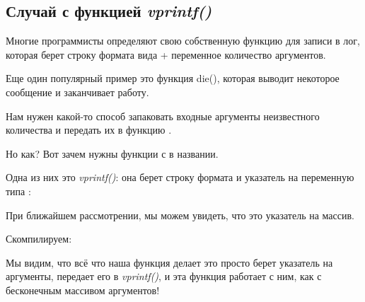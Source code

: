 \subsection{Случай с функцией \emph{vprintf()}}

Многие программисты определяют свою собственную функцию для записи в лог, которая берет строку формата 
вида \printf + переменное количество аргументов.

Еще один популярный пример это функция die(), которая выводит некоторое сообщение и заканчивает работу.

Нам нужен какой-то способ запаковать входные аргументы неизвестного количества и передать их в функцию \printf.

Но как?
Вот зачем нужны функции с  в названии.

Одна из них это \emph{vprintf()}: она берет строку формата и указатель на переменную типа :



При ближайшем рассмотрении, мы можем увидеть, что  это указатель на массив.

Скомпилируем:



Мы видим, что всё что наша функция делает это просто берет указатель на аргументы, 
передает его в \emph{vprintf()},
и эта функция работает с ним, как с бесконечным массивом аргументов!



